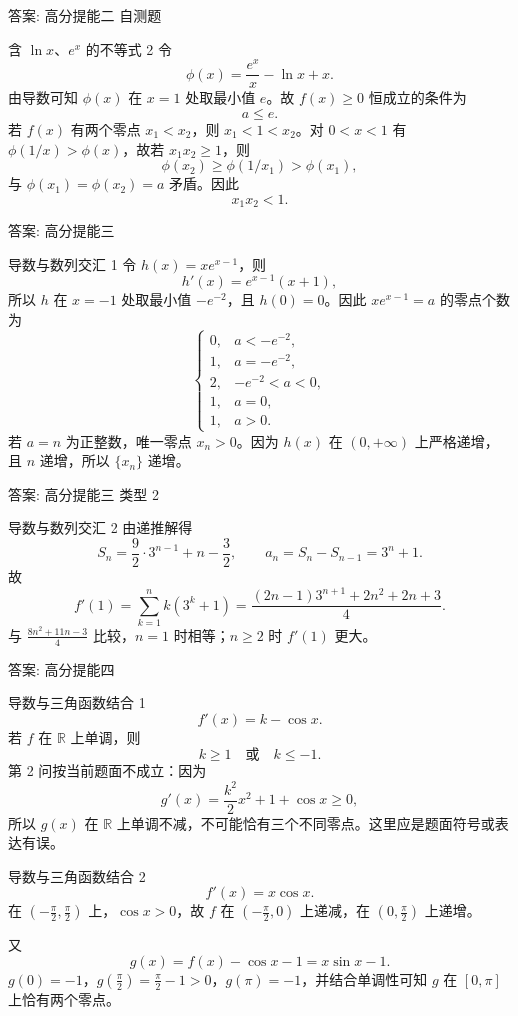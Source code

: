 ﻿\documentclass[aspectratio=169,10pt]{ctexbeamer}
\begin{document}
\begin{frame}[t]{答案: 高分提能二 自测题}
\tiny
\begin{block}{含 $\ln x$、$e^x$ 的不等式 2}
令
\[
\phi(x)=\frac{e^x}{x}-\ln x+x.
\]
由导数可知 $\phi(x)$ 在 $x=1$ 处取最小值 $e$。故 $f(x)\ge0$ 恒成立的条件为
\[
a\le e.
\]
若 $f(x)$ 有两个零点 $x_1<x_2$，则 $x_1<1<x_2$。对 $0<x<1$ 有 $\phi(1/x)>\phi(x)$，故若 $x_1x_2\ge1$，则
\[
\phi(x_2)\ge\phi(1/x_1)>\phi(x_1),
\]
与 $\phi(x_1)=\phi(x_2)=a$ 矛盾。因此
\[
x_1x_2<1.
\]
\end{block}
\end{frame}

\begin{frame}[t]{答案: 高分提能三}
\tiny
\begin{block}{导数与数列交汇 1}
令 $h(x)=xe^{x-1}$，则
\[
h'(x)=e^{x-1}(x+1),
\]
所以 $h$ 在 $x=-1$ 处取最小值 $-e^{-2}$，且 $h(0)=0$。因此 $xe^{x-1}=a$ 的零点个数为
\[
\begin{cases}
0,&a<-e^{-2},\\
1,&a=-e^{-2},\\
2,&-e^{-2}<a<0,\\
1,&a=0,\\
1,&a>0.
\end{cases}
\]
若 $a=n$ 为正整数，唯一零点 $x_n>0$。因为 $h(x)$ 在 $(0,+\infty)$ 上严格递增，且 $n$ 递增，所以 $\{x_n\}$ 递增。
\end{block}
\end{frame}

\begin{frame}[t]{答案: 高分提能三 类型 2}
\tiny
\begin{block}{导数与数列交汇 2}
由递推解得
\[
S_n=\frac92\cdot 3^{n-1}+n-\frac32,\qquad a_n=S_n-S_{n-1}=3^n+1.
\]
故
\[
f'(1)=\sum_{k=1}^n k(3^k+1)
=\frac{(2n-1)3^{n+1}+2n^2+2n+3}{4}.
\]
与 $\frac{8n^2+11n-3}{4}$ 比较，$n=1$ 时相等；$n\ge2$ 时 $f'(1)$ 更大。
\end{block}
\end{frame}

\begin{frame}[t]{答案: 高分提能四}
\tiny
\begin{block}{导数与三角函数结合 1}
\[
f'(x)=k-\cos x.
\]
若 $f$ 在 $\mathbb R$ 上单调，则
\[
k\ge1\quad \text{或}\quad k\le-1.
\]
第 2 问按当前题面不成立：因为
\[
g'(x)=\frac{k^2}{2}x^2+1+\cos x\ge0,
\]
所以 $g(x)$ 在 $\mathbb R$ 上单调不减，不可能恰有三个不同零点。这里应是题面符号或表达有误。
\end{block}
\begin{block}{导数与三角函数结合 2}
\[
f'(x)=x\cos x.
\]
在 $\left(-\frac\pi2,\frac\pi2\right)$ 上，$\cos x>0$，故 $f$ 在 $\left(-\frac\pi2,0\right)$ 上递减，在 $\left(0,\frac\pi2\right)$ 上递增。

又
\[
g(x)=f(x)-\cos x-1=x\sin x-1.
\]
$g(0)=-1$，$g(\frac\pi2)=\frac\pi2-1>0$，$g(\pi)=-1$，并结合单调性可知 $g$ 在 $[0,\pi]$ 上恰有两个零点。
\end{block}
\end{frame}
\end{document}
